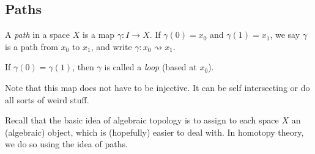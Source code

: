 \documentclass[a4paper]{article}
\begin{document}
\subsection{Paths}
\begin{defi}[Path]
  A \emph{path} in a space $X$ is a map $\gamma: I\to X$. If $\gamma(0) = x_0$ and $\gamma(1) = x_1$, we say $\gamma$ is a path from $x_0$ to $x_1$, and write $\gamma: x_0 \rightsquigarrow x_1$.

  If $\gamma(0) = \gamma(1)$, then $\gamma$ is called a \emph{loop} (based at $x_0$).
  \begin{center}
  \end{center}
\end{defi}
Note that this map does not have to be injective. It can be self intersecting or do all sorts of weird stuff.

Recall that the basic idea of algebraic topology is to assign to each space $X$ an (algebraic) object, which is (hopefully) easier to deal with. In homotopy theory, we do so using the idea of paths.
\end{document}
